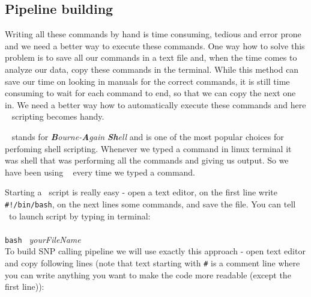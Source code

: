 \subsection{Pipeline building}
Writing all these commands by hand is time consuming, tedious and error prone
and we need a better way to execute these commands.
One way how to solve this problem is to save all our commands
in a text file and, when the time comes to analyze our data, copy these
commands in the terminal. While this method can save our time on looking
in manuals for the correct commands, it is still time consuming to wait
for each command to end, so that we can copy the next one in. 
We need a better way how to automatically execute these commands and
here \bash~ scripting becomes handy.

\bash~ stands for \textit{\textbf{B}ourne-\textbf{A}gain \textbf{Sh}ell}
and is one of the most popular choices for perfoming shell scripting. 
Whenever we typed a command in linux terminal it was shell that was
performing all the commands and giving us output.
So we have been using \bash~ every time we typed a command.

Starting a \bash~script is really easy - open a text editor, on the
first line write \texttt{\#!/bin/bash}, on the next lines some commands,
and save the file. You can tell \bash~to launch script by typing in terminal:\\~\\
\texttt{bash }\textit{ yourFileName}\\

To build SNP calling pipeline we will use exactly this approach -
open text editor and copy following lines (note that text starting
with \texttt{\#} is a comment line where you can write anything you want to make
the code more readable (except the first line)):

